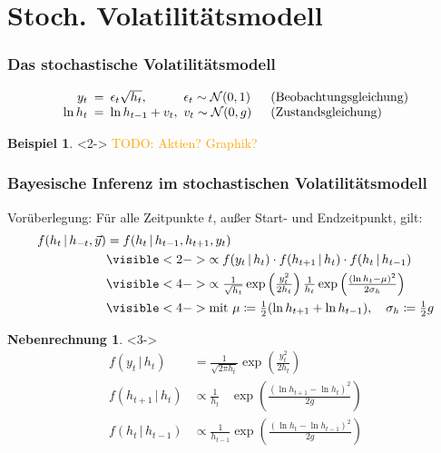 \documentclass[10pt]{beamer}
\theoremstyle{definition}
\newtheorem*{bsp}{Beispiel}
\newtheorem*{nebenrechnung}{Nebenrechnung}
\newcommand{\Normal}{\mathcal{N}} %
\newcommand{\TODO}[1]{\textcolor{orange}{TODO: #1}}
\begin{document}


\section{Stoch. Volatilitätsmodell}

\begin{frame}
  \frametitle{Das stochastische Volatilitätsmodell}
  \[
    \arraycolsep=2.5pt
    \begin{array}{rclll}
      y_t &=& \epsilon_t \sqrt{h_t}, & \epsilon_t \sim \Normal(0, 1) \quad & \text{(Beobachtungsgleichung)} \\
      \ln h_t &=& \ln h_{t-1} + v_t, & v_t \sim \Normal(0, g) \quad & \text{(Zustandsgleichung)}
    \end{array}
  \]
  \begin{bsp}<2->
    \TODO{Aktien? Graphik?}
  \end{bsp}
\end{frame}

\begin{frame}
  \frametitle{Bayesische Inferenz im stochastischen Volatilitätsmodell}

  Vorüberlegung: Für alle Zeitpunkte $t$, außer Start- und Endzeitpunkt, gilt:
  \begin{align*}
    f(h_t \,|\, h_{-t}, \vec{y}) & = f(h_t \,|\, h_{t-1}, h_{t+1}, y_t) \\
    & \visible<2->{\propto f(y_t \,|\, h_t) \cdot f(h_{t+1} \,|\, h_t) \cdot f(h_t \,|\, h_{t-1})} \\
    & \visible<4->{\propto \tfrac{1}{\sqrt{h_t}} \exp \left( \tfrac{y_t^2}{2 h_t} \right) \tfrac{1}{h_t} \exp \left( \tfrac{(\ln h_t - \mu)^2}{2 \sigma_h} \right) } \\
    & \visible<4->{\text{mit } \mu \coloneqq \tfrac{1}{2} (\ln h_{t+1} + \ln h_{t-1}), \quad \sigma_h \coloneqq \tfrac{1}{2} g}
  \end{align*}
  \begin{nebenrechnung}<3->
    \begin{align*}
      f(y_t \,|\, h_t) & = \tfrac{1}{\sqrt{2 \pi h_t}} \exp \left( \tfrac{y_t^2}{2 h_t} \right) \\
      f(h_{t+1} \,|\, h_t) & \propto \tfrac{1}{h_t} \enspace\,\, \exp \left( \tfrac{(\ln h_{t+1} - \ln h_t)^2}{2 g} \right) \\
      f(h_t \,|\, h_{t-1}) & \propto \tfrac{1}{h_{t-1}} \exp \left( \tfrac{(\ln h_t - \ln h_{t-1})^2}{2 g} \right)
    \end{align*}
  \end{nebenrechnung}
\end{frame}
\end{document}
